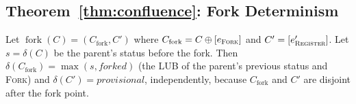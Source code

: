 \subsection{Theorem~\ref{thm:confluence}: Fork Determinism}

\begin{theorem}\label{thm:confluence}
Let $\operatorname{fork}(C) = (C_{\text{fork}}, C')$ where $C_{\text{fork}} = C \oplus [e_{\textsc{Fork}}]$ and $C' = [e'_{\textsc{Register}}]$. Let $s = \delta(C)$ be the parent's status before the fork. Then $\delta(C_{\text{fork}}) = \max(s, \textit{forked})$ (the LUB of the parent's previous status and \textsc{Fork}) and $\delta(C') = \textit{provisional}$, independently, because $C_{\text{fork}}$ and $C'$ are disjoint after the fork point.
\end{theorem}

